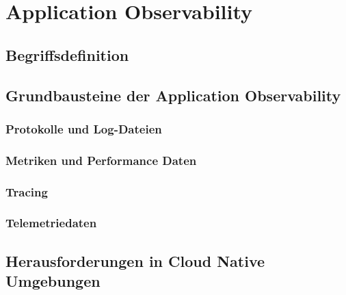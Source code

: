 \newpage
\section{Application Observability}\label{lab:application_observability}
\subsection{Begriffsdefinition}
\subsection{Grundbausteine der Application Observability}
\subsubsection{Protokolle und Log-Dateien}
\subsubsection{Metriken und Performance Daten}
\subsubsection{Tracing}
\subsubsection{Telemetriedaten}
\subsection{Herausforderungen in Cloud Native Umgebungen}